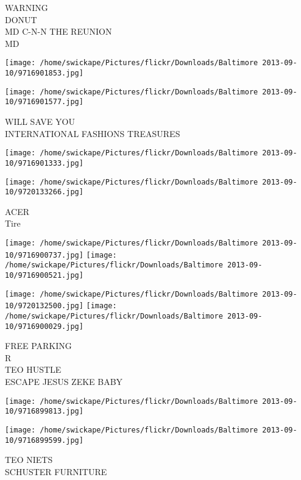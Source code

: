 \documentclass[10pt,letterpaper]{article}
\begin{document}
WARNING\\
DONUT\\
MD C{-}N{-}N THE REUNION\\
MD\\
\pagebreak

\texttt{[image: /home/swickape/Pictures/flickr/Downloads/Baltimore 2013-09-10/9716901853.jpg]}

\vspace{0.25in}
\texttt{[image: /home/swickape/Pictures/flickr/Downloads/Baltimore 2013-09-10/9716901577.jpg]}

WILL SAVE YOU\\
INTERNATIONAL FASHIONS TREASURES\\
\pagebreak

\texttt{[image: /home/swickape/Pictures/flickr/Downloads/Baltimore 2013-09-10/9716901333.jpg]}

\vspace{0.25in}
\texttt{[image: /home/swickape/Pictures/flickr/Downloads/Baltimore 2013-09-10/9720133266.jpg]}

ACER\\
Tire\\
\pagebreak

\texttt{[image: /home/swickape/Pictures/flickr/Downloads/Baltimore 2013-09-10/9716900737.jpg]}
\texttt{[image: /home/swickape/Pictures/flickr/Downloads/Baltimore 2013-09-10/9716900521.jpg]}

\texttt{[image: /home/swickape/Pictures/flickr/Downloads/Baltimore 2013-09-10/9720132500.jpg]}
\texttt{[image: /home/swickape/Pictures/flickr/Downloads/Baltimore 2013-09-10/9716900029.jpg]}

FREE PARKING\\
R\\
TEO HUSTLE\\
ESCAPE JESUS ZEKE BABY\\
\pagebreak

\texttt{[image: /home/swickape/Pictures/flickr/Downloads/Baltimore 2013-09-10/9716899813.jpg]}

\vspace{0.25in}
\texttt{[image: /home/swickape/Pictures/flickr/Downloads/Baltimore 2013-09-10/9716899599.jpg]}

TEO NIETS\\
SCHUSTER FURNITURE\\
\pagebreak
\end{document}
